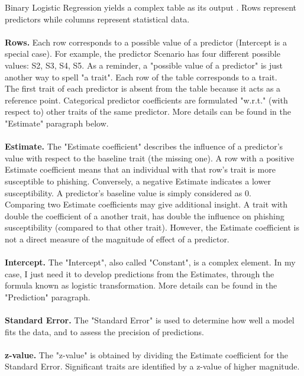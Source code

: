 \documentclass[a4paper]{article}
\begin{document}
\noindent
Binary Logistic Regression yields a complex table as its output \cite{stats-interpretation-blr}. Rows represent predictors while columns represent statistical data. 
\\ \\
\textbf{Rows.} Each row corresponds to a possible value of a predictor (Intercept is a special case). For example, the predictor Scenario has four different possible values: S2, S3, S4, S5. As a reminder, a "possible value of a predictor" is just another way to spell "a trait". Each row of the table corresponds to a trait.
\\
The first trait of each predictor is absent from the table because it acts as a reference point. Categorical predictor coefficients are formulated "w.r.t." (with respect to) other traits of the same predictor. More details can be found in the "Estimate" paragraph below.
\\ \\
\textbf{Estimate.} The "Estimate coefficient" describes the influence of a predictor's value with respect to the baseline trait (the missing one). A row with a positive Estimate coefficient means that an individual with that row's trait is more susceptible to phishing. Conversely, a negative Estimate indicates a lower susceptibility. A predictor's baseline value is simply considered as 0.
\\
Comparing two Estimate coefficients may give additional insight. A trait with double the coefficient of a another trait, has double the influence on phishing susceptibility (compared to that other trait). However, the Estimate coefficient is not a direct measure of the magnitude of effect of a predictor.  
\\ \\
\textbf{Intercept.} The "Intercept", also called "Constant", is a complex element. In my case, I just need it to develop predictions from the Estimates, through the formula known as logistic transformation. More details can be found in the "Prediction" paragraph.
\\ \\
\textbf{Standard Error.} The "Standard Error" is used to determine how well a model fits the data, and to assess the precision of predictions.
\\ \\
\textbf{z-value.} The "z-value" is obtained by dividing the Estimate coefficient for the Standard Error. Significant traits are identified by a z-value of higher magnitude.
\\ \\
\end{document}

